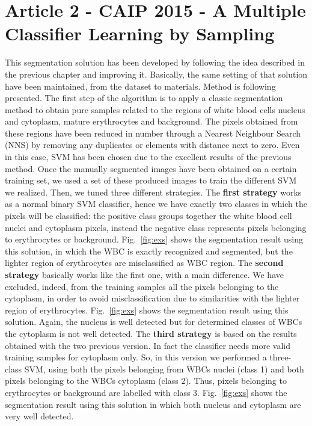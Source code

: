 \documentclass[final,a4paper,12pt,english]{UnicaPhdThesis3}
\begin{document}
\section{Article 2 - CAIP 2015 -  A Multiple Classifier Learning by Sampling}
This segmentation solution has been developed by following the idea described in the previous chapter and improving it.
Basically, the same setting of that solution have been maintained, from the dataset to materials. Method is following presented.
The first step of the algorithm is to apply a classic segmentation method to obtain pure samples related to the regions of white blood cells nucleus and cytoplasm, mature erythrocytes and background. The pixels obtained from these regions have been reduced in number through a Nearest Neighbour  Search (NNS) by removing any duplicates or elements with distance next to zero. Even in this case, SVM has been chosen due to the excellent results of the previous method. Once the manually segmented images have been obtained on a certain training set, we used a set of these produced images to train the different SVM we realized. Then, we tuned three different strategies. 
The \textbf{first strategy} works as a normal binary SVM classifier, hence we have exactly two classes in which the pixels will be classified: the positive class groups together the white blood cell nuclei and cytoplasm pixels, instead the negative class represents pixels belonging to erythrocytes or background. Fig.~\ref{fig:exs} shows the segmentation result using this solution, in which the WBC is exactly recognized and segmented, but the lighter region of erythrocytes are misclassified as WBC region. 
The \textbf{second strategy} basically works like the first one, with a main difference. We have excluded, indeed, from the training samples all the pixels belonging to the cytoplasm, in order to avoid misclassification due to similarities with the lighter region of erythrocytes. Fig.~\ref{fig:exs} shows the segmentation result using this solution. Again, the nucleus is well detected but for determined classes of WBCs the cytoplasm is not well detected. 
The \textbf{third strategy} is based on the results obtained with the two previous version. In fact the classifier needs more valid training samples for cytoplasm only. So, in this version we performed a three-class SVM, using both the pixels belonging from WBCs nuclei (class 1) and both pixels belonging to the WBCs cytoplasm (class 2). Thus, pixels belonging to erythrocytes or background are labelled with class 3. Fig.~\ref{fig:exs} shows the segmentation result using this solution in which both nucleus and cytoplasm are very well detected.
\end{document}
